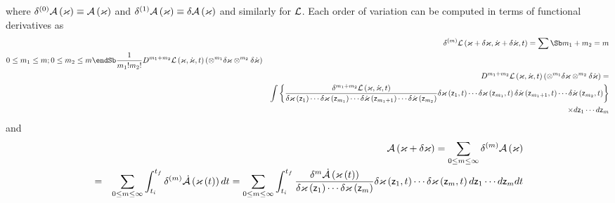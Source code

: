 where $\delta ^{\left( 0\right) }{\cal A}\left( \varkappa \right) \equiv 
{\cal A}\left( \varkappa \right) $ and $\delta ^{\left( 1\right) }{\cal A}%
\left( \varkappa \right) \equiv \delta {\cal A}\left( \varkappa \right) $
and similarly for ${\cal L}$. Each order of variation can be computed in
terms of functional derivatives as 
\begin{eqnarray}
&&\delta ^{\left( m\right) }{\cal L}\left( \varkappa +\delta \varkappa ,\dot{%
\varkappa}+\delta \dot{\varkappa},t\right) =\sum\Sb m_{1}+m_{2}=m  \\ 0\leq
m_{1}\leq m;0\leq m_{2}\leq m  \endSb \frac{1}{m_{1}!m_{2}!}D^{m_{1}+m_{2}}%
{\cal L}\left( \varkappa ,\dot{\varkappa},t\right) \left( \otimes
^{m_{1}}\delta \varkappa \otimes ^{m_{2}}\delta \dot{\varkappa}\right) 
\nonumber \\
&&D^{m_{1}+m_{2}}{\cal L}\left( \varkappa ,\dot{\varkappa},t\right) \left(
\otimes ^{m_{1}}\delta \varkappa \otimes ^{m_{2}}\delta \dot{\varkappa}%
\right) =  \nonumber \\
&&\int \left\{ \frac{\delta ^{m_{1}+m_{2}}{\cal L}\left( \varkappa ,\dot{%
\varkappa},t\right) }{\delta \varkappa \left( {\sf z}_{1}\right) \cdots
\delta \varkappa \left( {\sf z}_{m_{1}}\right) \cdots \delta \dot{\varkappa}%
\left( {\sf z}_{m_{1}+1}\right) \cdots \delta \dot{\varkappa}\left( {\sf z}%
_{m_{2}}\right) }\delta \varkappa \left( {\sf z}_{1},t\right) \cdots \delta
\varkappa \left( {\sf z}_{m_{1}},t\right) \delta \dot{\varkappa}\left( {\sf z%
}_{m_{1}+1},t\right) \cdots \delta \dot{\varkappa}\left( {\sf z}%
_{m_{2}},t\right) \right\}  \nonumber \\
&&\qquad \qquad \qquad \qquad \qquad \qquad \qquad \qquad \qquad \qquad
\qquad \qquad \qquad \qquad \qquad \qquad \qquad \qquad \times d{\sf z}%
_{1}\cdots d{\sf z}_{m}
\end{eqnarray}%
and 
\begin{eqnarray}
&&{\cal A}\left( \varkappa +\delta \varkappa \right) =\sum_{0\leq m\leq
\infty }\delta ^{\left( m\right) }{\cal A}\left( \varkappa \right)  \nonumber
\\
&=&\sum_{0\leq m\leq \infty }\int_{t_{i}}^{t_{f}}\delta ^{\left( m\right) }%
{\cal \dot{A}}\left( \varkappa \left( t\right) \right) dt=\sum_{0\leq m\leq
\infty }\int_{t_{i}}^{t_{f}}\frac{\delta ^{m}{\cal \dot{A}}\left( \varkappa
\left( t\right) \right) }{\delta \varkappa \left( {\sf z}_{1}\right) \cdots
\delta \varkappa \left( {\sf z}_{m}\right) }\delta \varkappa \left( {\sf z}%
_{1},t\right) \cdots \delta \varkappa \left( {\sf z}_{m},t\right) d{\sf z}%
_{1}\cdots d{\sf z}_{m}dt
\end{eqnarray}%
